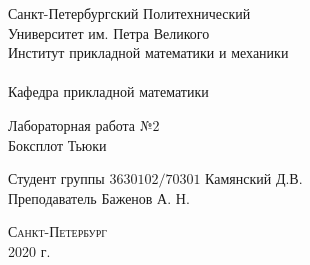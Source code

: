 \documentclass[a4]{article}
\begin{document}
\def\contentsname{\LARGE{Содержание}}
\thispagestyle{empty}
\begin{center} 
\vspace{2cm} 
{\Large \sc Санкт-Петербургский Политехнический}\\
\vspace{2mm}
{\Large \sc Университет} им. {\Large\sc Петра Великого}\\
\vspace{1cm}
{\large \sc Институт прикладной математики и механики\\ 
\vspace{0.5mm}
\textsc{}}\\ 
\vspace{0.5mm}
{\large\sc Кафедра прикладной математики}\\
\vspace{15mm}
{\huge \sc Лабораторная работа №$2$\\
	Боксплот Тьюки
	\vspace{6mm}
	
}
\vspace*{2mm}
\vspace{6cm} 
Студент группы $3630102/70301$ \hfill Камянский Д.В.\\
\vspace{1cm}
Преподаватель \hfill Баженов А. Н.\\
\vspace{20mm} 


\vfill {\large\textsc{Санкт-Петербург}}\\ 
2020 г.
\end{center}


\newpage
\pagestyle{plain}

\end{document}
